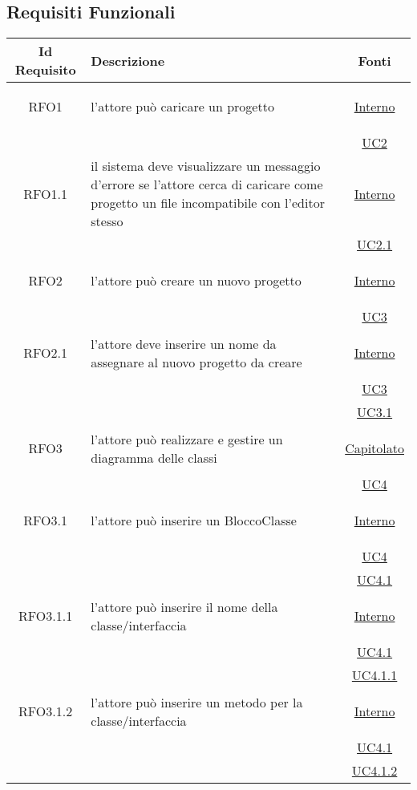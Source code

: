 \subsection{Requisiti Funzionali}
\normalsize
\begin{longtable}{|c|>{\centering}m{7cm}|c|}
\hline
\textbf{Id Requisito} & \textbf{Descrizione} & \textbf{Fonti}\\
\hline
\endhead
\hypertarget{RFO1}{RFO1} & l'attore può caricare un progetto &  \hyperlink{Interno}{Interno}\\
& & \hyperref[UC2]{UC2}\\ \hline

\hypertarget{RFO1.1}{RFO1.1} & il sistema deve visualizzare un messaggio d'errore se l'attore cerca di caricare come progetto un file incompatibile con l'editor stesso &  \hyperlink{Interno}{Interno}\\
& & \hyperref[UC2.1]{UC2.1}\\ \hline

\hypertarget{RFO2}{RFO2} & l'attore può creare un nuovo progetto &  \hyperlink{Interno}{Interno}\\
& & \hyperref[UC3]{UC3}\\ \hline

\hypertarget{RFO2.1}{RFO2.1} & l'attore deve inserire un nome da assegnare al nuovo progetto da creare&  \hyperlink{Interno}{Interno}\\
& &\hyperref[UC3]{UC3}\\ 
& &\hyperref[UC3.1]{UC3.1}\\ \hline

\hypertarget{RFO3}{RFO3} & l'attore può realizzare e gestire un diagramma delle classi & \hyperlink{Capitolato}{Capitolato}\\
& & \hyperref[UC4]{UC4}\\ \hline

\hypertarget{RFO3.1}{RFO3.1} & l'attore può inserire un BloccoClasse &  \hyperlink{Interno}{Interno}\\
& &\hyperref[UC4]{UC4}\\
& &\hyperref[UC4.1]{UC4.1}\\ \hline

\hypertarget{RFO3.1.1}{RFO3.1.1} & l'attore può inserire il nome della classe/interfaccia & \hyperlink{Interno}{Interno}\\
& &\hyperref[UC4.1]{UC4.1}\\
& &\hyperref[UC4.1.1]{UC4.1.1}\\ \hline

\hypertarget{RFO3.1.2}{RFO3.1.2} & l'attore può inserire un metodo per la classe/interfaccia & \hyperlink{Interno}{Interno}\\
& &\hyperref[UC4.1]{UC4.1}\\
& &\hyperref[UC4.1.2]{UC4.1.2}\\ \hline


\end{longtable}

